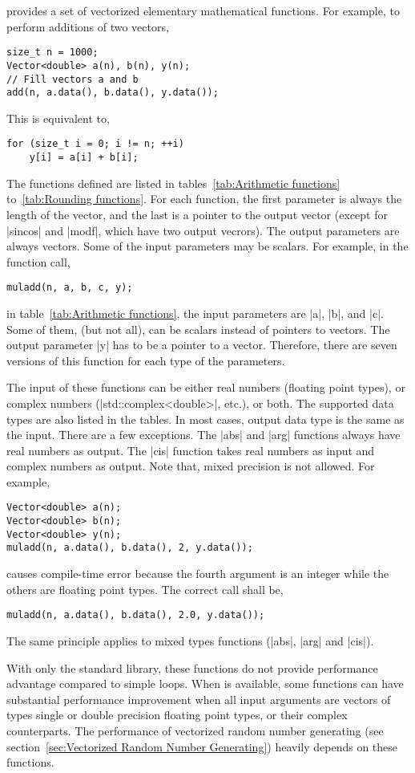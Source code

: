 \mckl provides a set of vectorized elementary mathematical functions. For
example, to perform additions of two vectors,
\begin{verbatim}
size_t n = 1000;
Vector<double> a(n), b(n), y(n);
// Fill vectors a and b
add(n, a.data(), b.data(), y.data());
\end{verbatim}
This is equivalent to,
\begin{verbatim}
for (size_t i = 0; i != n; ++i)
    y[i] = a[i] + b[i];
\end{verbatim}
The functions defined are listed in tables~\ref{tab:Arithmetic functions}
to~\ref{tab:Rounding functions}. For each function, the first parameter is
always the length of the vector, and the last is a pointer to the output vector
(except for |sincos| and |modf|, which have two output vecrors). The output
parameters are always vectors. Some of the input parameters may be scalars. For
example, in the function call,
\begin{verbatim}
muladd(n, a, b, c, y);
\end{verbatim}
in table~\ref{tab:Arithmetic functions}, the input parameters are |a|, |b|, and
|c|. Some of them, (but not all), can be scalars instead of pointers to
vectors. The output parameter |y| has to be a pointer to a vector. Therefore,
there are seven versions of this function for each type of the parameters.

The input of these functions can be either real numbers (floating point types),
or complex numbers (|std::complex<double>|, etc.), or both. The supported data
types are also listed in the tables. In most cases, output data type is the
same as the input. There are a few exceptions. The |abs| and |arg| functions
always have real numbers as output. The |cis| function takes real numbers as
input and complex numbers as output. Note that, mixed precision is not allowed.
For example,
\begin{verbatim}
Vector<double> a(n);
Vector<double> b(n);
Vector<double> y(n);
muladd(n, a.data(), b.data(), 2, y.data());
\end{verbatim}
causes compile-time error because the fourth argument is an integer while the
others are floating point types. The correct call shall be,
\begin{verbatim}
muladd(n, a.data(), b.data(), 2.0, y.data());
\end{verbatim}
The same principle applies to mixed types functions (|abs|, |arg| and |cis|).

With only the standard library, these functions do not provide performance
advantage compared to simple loops. When \mkl \vml is available, some functions
can have substantial performance improvement when all input arguments are
vectors of types single or double precision floating point types, or their
complex counterparts. The performance of vectorized random number generating
(see section~\ref{sec:Vectorized Random Number Generating}) heavily depends on
these functions.

